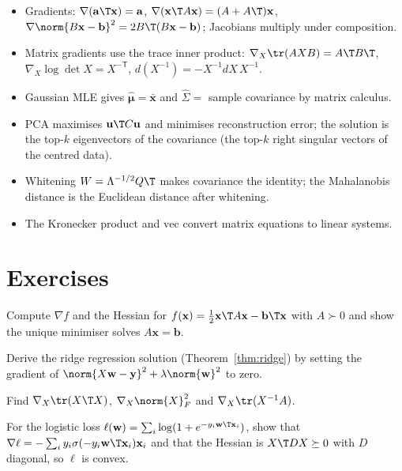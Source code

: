 \begin{summarybox}
\begin{itemize}
  \item Gradients: $\nabla(\mathbf{a}\T\mathbf{x})=\mathbf{a}$, $\nabla(\mathbf{x}\T A\mathbf{x})=(A+A\T)\mathbf{x}$, $\nabla\norm{B\mathbf{x}-\mathbf{b}}^2=2B\T(B\mathbf{x}-\mathbf{b})$; Jacobians multiply under composition.
  \item Matrix gradients use the trace inner product: $\nabla_X\tr(AXB)=A\T B\T$, $\nabla_X\log\det X=X^{-\mathsf T}$, $d(X^{-1})=-X^{-1}dX\,X^{-1}$.
  \item Gaussian MLE gives $\hat{\boldsymbol\mu}=\bar{\mathbf{x}}$ and $\hat\Sigma=$ sample covariance by matrix calculus.
  \item PCA maximises $\mathbf{u}\T C\mathbf{u}$ and minimises reconstruction error; the solution is the top-$k$ eigenvectors of the covariance (the top-$k$ right singular vectors of the centred data).
  \item Whitening $W=\Lambda^{-1/2}Q\T$ makes covariance the identity; the Mahalanobis distance is the Euclidean distance after whitening.
  \item The Kronecker product and $\mathrm{vec}$ convert matrix equations to linear systems.
\end{itemize}
\end{summarybox}

\section{Exercises}

\begin{exercise}
Compute $\nabla f$ and the Hessian for $f(\mathbf{x})=\tfrac12\mathbf{x}\T A\mathbf{x}-\mathbf{b}\T\mathbf{x}$ with $A\succ0$ and show the unique minimiser solves $A\mathbf{x}=\mathbf{b}$.
\end{exercise}

\begin{exercise}
Derive the ridge regression solution (Theorem~\ref{thm:ridge}) by setting the gradient of $\norm{X\mathbf{w}-\mathbf{y}}^2+\lambda\norm{\mathbf{w}}^2$ to zero.
\end{exercise}

\begin{exercise}
Find $\nabla_X\tr(X\T X)$, $\nabla_X\norm{X}_F^2$ and $\nabla_X\tr(X^{-1}A)$.
\end{exercise}

\begin{exercise}
For the logistic loss $\ell(\mathbf{w})=\sum_i\log(1+e^{-y_i\mathbf{w}\T\mathbf{x}_i})$, show that $\nabla\ell=-\sum_iy_i\sigma(-y_i\mathbf{w}\T\mathbf{x}_i)\mathbf{x}_i$ and that the Hessian is $X\T DX\succeq0$ with $D$ diagonal, so $\ell$ is convex.
\end{exercise}

